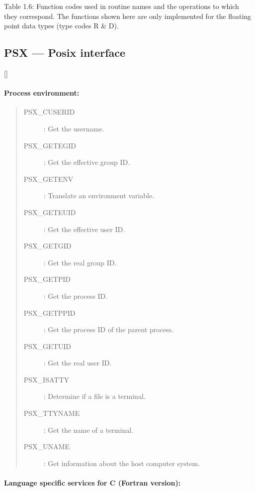 Table 1.6: Function codes used in routine names and the operations to which they
correspond. 
The functions shown here are only implemented for the floating point data types 
(type codes R \& D).

\newpage

\subsection{PSX --- Posix interface}

\vspace{-9mm}

\hfill []

\vspace{2mm}

\paragraph{Process environment:} \hfill

\begin{quote}
\begin{description}
\item [PSX\_CUSERID] : Get the username.
\item [PSX\_GETEGID] : Get the effective group ID.
\item [PSX\_GETENV] : Translate an environment variable.
\item [PSX\_GETEUID] : Get the effective user ID.
\item [PSX\_GETGID] : Get the real group ID.
\item [PSX\_GETPID] : Get the process ID.
\item [PSX\_GETPPID] : Get the process ID of the parent process.
\item [PSX\_GETUID] : Get the real user ID.
\item [PSX\_ISATTY] : Determine if a file is a terminal.
\item [PSX\_TTYNAME] : Get the name of a terminal.
\item [PSX\_UNAME] : Get information about the host computer system.
\end{description}
\end{quote}

\vspace{10mm}

\paragraph{Language specific services for C (Fortran version):}

